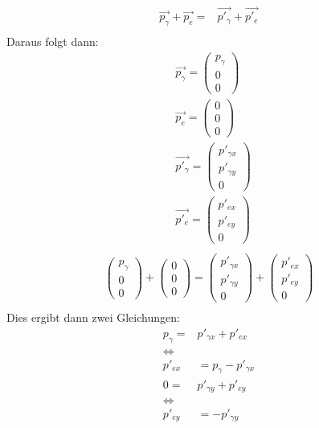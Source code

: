 \begin{align*}
	\overrightarrow{p_\gamma} +\overrightarrow{p_e}=&\overrightarrow{p'_\gamma}+\overrightarrow{p'_e}\\
\end{align*}
Daraus folgt dann:\\
\begin{align*}
	&\overrightarrow{p_\gamma}=\begin{pmatrix}p_\gamma\\0\\0 \end{pmatrix}\\
	&\overrightarrow{p_e}=\begin{pmatrix}0 \\0\\0 \end{pmatrix}\\
	&\overrightarrow{p'_\gamma}= \begin{pmatrix}p'_{\gamma x}  \\p'_{\gamma y}\\0 \end{pmatrix}\\
	&\overrightarrow{p'_e}=  \begin{pmatrix}p'_{ex} \\p'_{ey} \\0 \end{pmatrix}\\
\end{align*}
\begin{align*}
	\begin{pmatrix}p_\gamma\\0\\0 \end{pmatrix}+\begin{pmatrix}0 \\0\\0 \end{pmatrix}= \begin{pmatrix}p'_{\gamma x} \\p'_{\gamma y}\\0 \end{pmatrix}+  \begin{pmatrix}p'_{ex}\\p'_{ey} \\0 \end{pmatrix}\\
\end{align*}
Dies ergibt dann zwei Gleichungen:\\
\begin{align}
	p_\gamma=&p'_{\gamma x}+p'_{ex} \nonumber\\
	\Leftrightarrow \nonumber\\
	p'_{ex}&=p_\gamma-p'_{\gamma x} \label{pex}  \\
	0=&p'_{\gamma y}+p'_{e y} \nonumber\\
	\Leftrightarrow \nonumber\\
	p'_{ey}&=-p'_{\gamma y}\label{pe}
\end{align}
